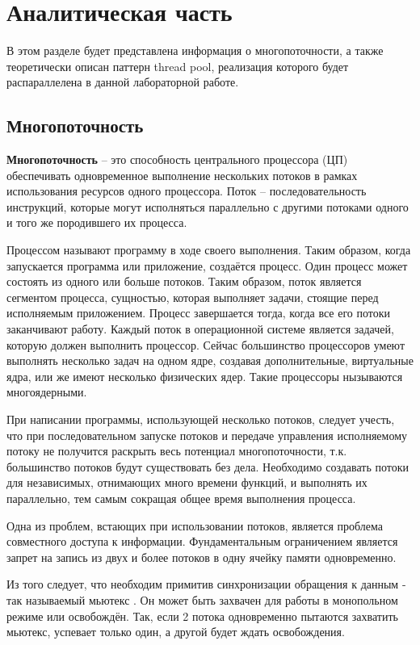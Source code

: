 \chapter{Аналитическая часть}
В этом разделе будет представлена информация о многопоточности, а также теоретически описан паттерн thread pool, реализация которого будет распараллелена в данной лабораторной работе. 

\section{Многопоточность}
\textbf{Многопоточность} \cite{multithreading} -- это способность центрального процессора (ЦП) обеспечивать одновременное выполнение нескольких потоков в рамках использования ресурсов одного процессора. Поток -- последовательность инструкций, которые могут исполняться параллельно с другими потоками одного и того же породившего их процесса.

Процессом \cite{process} называют программу в ходе своего выполнения. Таким образом, когда запускается программа или приложение, создаётся процесс. Один процесс может состоять из одного или больше потоков.
Таким образом, поток является сегментом процесса, сущностью, которая выполняет задачи, стоящие перед исполняемым приложением. 
Процесс завершается тогда, когда все его потоки заканчивают работу.
Каждый поток в операционной системе является задачей, которую должен выполнить процессор. Сейчас большинство процессоров умеют выполнять несколько задач на одном ядре, создавая дополнительные, виртуальные ядра, или же имеют несколько физических ядер. Такие процессоры нызываются многоядерными. 

При написании программы, использующей несколько потоков, следует учесть, что при последовательном запуске потоков и передаче управления исполняемому потоку не получится раскрыть весь потенциал многопоточности, т.к. большинство потоков будут существовать без дела.
Необходимо создавать потоки для независимых, отнимающих много времени функций, и выполнять их параллельно, тем самым сокращая общее время выполнения процесса.\newline


Одна из проблем, встающих при использовании потоков, является проблема совместного доступа к информации. Фундаментальным ограничением является запрет на запись из двух и более потоков в одну ячейку памяти одновременно.

Из того следует, что необходим примитив синхронизации обращения к данным - так называемый мьютекс . 
Он может быть захвачен для работы в монопольном режиме или освобождён. 
Так, если 2 потока одновременно пытаются захватить мьютекс, успевает только один, а другой будет ждать освобождения. 

